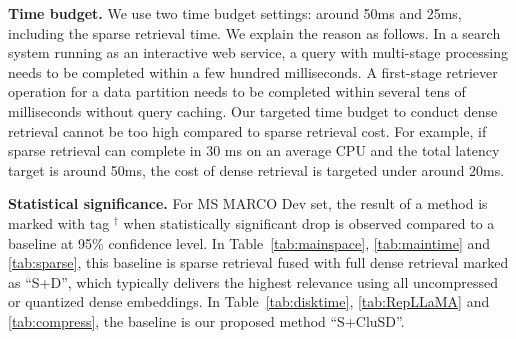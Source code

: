 {\bf Time budget.}
We use  two time budget settings: around 50ms  and 25ms, including the  sparse retrieval time.
We explain the reason as follows.
In a search system running as an interactive  web service,  a query with multi-stage processing
needs to be completed within a few hundred milliseconds.
A first-stage retriever operation  for a data partition needs to be completed within several tens of milliseconds without query caching.
Our targeted time budget to conduct dense retrieval cannot be too high     compared to  sparse retrieval cost.
For example, if sparse retrieval can complete  in 30 ms on an  average CPU and the total latency
target is around 50ms,  the cost of dense retrieval is targeted under around  20ms.



{\bf Statistical significance.}
For MS MARCO Dev set, the result of a method is marked with  tag $^\dag$ when 
statistically significant drop is observed compared to  a baseline at 95\% confidence level.  In Table~\ref{tab:mainspace}, \ref{tab:maintime} and \ref{tab:sparse}, this baseline 
is sparse retrieval fused with full dense retrieval marked as ``S+D'', which typically delivers the highest relevance  
using all uncompressed or quantized dense embeddings. In Table~\ref{tab:disktime}, \ref{tab:RepLLaMA} and \ref{tab:compress}, the baseline is our proposed method ``S+CluSD''. 


